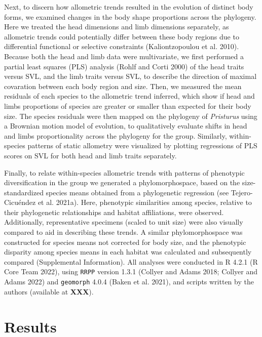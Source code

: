 \documentclass[
  11pt,
]{article}
\begin{document}
Next, to discern how allometric trends resulted in the evolution of
distinct body forms, we examined changes in the body shape proportions
across the phylogeny. Here we treated the head dimensions and limb
dimensions separately, as allometric trends could potentially differ
between these body regions due to differential functional or selective
constraints (Kaliontzopoulou et al. 2010). Because both the head and
limb data were multivariate, we first performed a partial least squares
(PLS) analysis (Rohlf and Corti 2000) of the head traits versus SVL, and
the limb traits versus SVL, to describe the direction of maximal
covaration between each body region and size. Then, we measured the mean
residuals of each species to the allometric trend inferred, which show
if head and limbs proportions of species are greater or smaller than
expected for their body size. The species residuals were then mapped on
the phylogeny of \emph{Pristurus} using a Brownian motion model of
evolution, to qualitatively evaluate shifts in head and limbs
proportionality across the phylogeny for the group. Similarly,
within-species patterns of static allometry were visualized by plotting
regressions of PLS scores on SVL for both head and limb traits
separately. \hfill\break

Finally, to relate within-species allometric trends with patterns of
phenotypic diversification in the group we generated a phylomorphospace,
based on the size-standardized species means obtained from a
phylogenetic regression (see Tejero-Cicuéndez et al. 2021a). Here,
phenotypic similarities among species, relative to their phylogenetic
relationships and habitat affiliations, were observed. Additionally,
representative specimens (scaled to unit size) were also visually
compared to aid in describing these trends. A similar phylomorphospace
was constructed for species means not corrected for body size, and the
phenotypic disparity among species means in each habitat was calculated
and subsequently compared (Supplemental Information). All analyses were
conducted in R 4.2.1 (R Core Team 2022), using \texttt{RRPP} version
1.3.1 (Collyer and Adams 2018; Collyer and Adams 2022) and
\texttt{geomorph} 4.0.4 (Baken et al. 2021), and scripts written by the
authors (available at \textbf{XXX}).

\hypertarget{results}{%
\section{Results}\label{results}}
\end{document}
